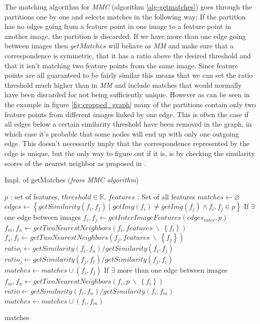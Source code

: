 \documentclass{article}
\begin{document}
The matching algorithm for \emph{MMC} (algorithm \ref{alg-getmatches}) 
goes through the partitions one by one and selects matches in the 
following way: If the partition has no edges going from a feature point 
in one image to a feature point in another image, the partition is 
discarded. If we have more than one edge going between images then 
$getMatches$ will behave as \emph{MM} and make sure that a 
correspondence is symmetric, that it has a ratio above the desired 
threshold and that it isn't matching two feature points from the same 
image. Since feature points are all guaranteed to be fairly similar this 
means that we can set the ratio threshold much higher than in \emph{MM} 
and include matches that would normally have been discarded for not 
being sufficiently unique.
However as can be seen in the example in figure \ref{fig:cropped_graph} 
many of the partitions contain only two feature points from different 
images linked by one edge. This is often the case if all edges below a 
certain similarity threshold have been removed in the graph, in which 
case it's probable that some nodes will end up with only one outgoing 
edge. This doesn't necessarily imply that the correspondence represented 
by the edge is unique, but the only way to figure out if it is, is by 
checking the similarity scores of the nearest neighbor as proposed in 
\cite{lowe2004sift}.

\begin{algorithm}
\caption{Impl. of getMatches (\emph{from MMC algorithm})}
\label{alg-getmatches}
\begin{algorithmic}
\Require $p$ : set of features, $threshold \in \mathbb{R}$, $features$ : 
Set of all features
\State $matches \gets \varnothing$
\State $edges \gets \left\{getSimilarity(f_i, f_j) \mid getImg(f_i) \neq 
getImg(f_j) \wedge f_i, f_j \in p \right\}$
 \Comment If $\exists$ one edge 
between images
	\State $f_i,f_j \gets getInterImageFeatures(edges_{inter}, p)$
	\State $f_m,f_n \gets getTwoNearestNeighbors(f_i, features ~ 
\backslash ~ \left\{f_i\right\})$
	\State $f_s,f_t \gets getTwoNearestNeighbors(f_j, features ~ 
\backslash ~ \left\{f_j\right\})$
	\State $ratio_i \gets getSimilarity(f_i, f_n) / getSimilarity(f_i, 
f_j)$
	\State $ratio_j \gets getSimilarity(f_j, f_t) / getSimilarity(f_j, 
f_i)$
		\State $matches \gets matches \cup (f_i, f_j)$
	\EndIf
{} \Comment If $\exists$ more 
than one edge between images
		\State $f_m,f_n \gets getTwoNearestNeighbors(f_i, p ~ \backslash 
~ \left\{f_i\right\})$
		\State $ratio \gets getSimilarity(f_i, f_n) / getSimilarity(f_i, 
f_m)$
			\State $matches \gets matches \cup (f_i, f_m)$
		\EndIf
	\EndFor
\EndIf

\Return matches
\end{algorithmic}
\end{algorithm}
\end{document}
